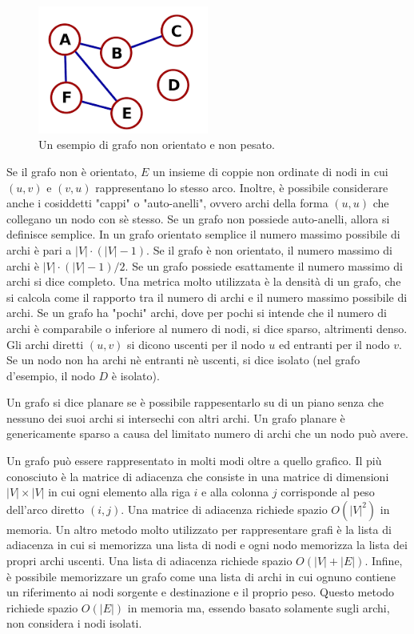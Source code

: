 \documentclass[12pt,a4paper,oneside]{book}
\begin{document}
	\begin{figure}
		\centering
		\includegraphics[width=0.5\textwidth]{grafo-esempio}
		\caption{Un esempio di grafo non orientato e non pesato.}
		\label{fig:grafo-esempio}
	\end{figure}

	Se il grafo non è orientato, $E$ un insieme di coppie non ordinate di nodi in cui $(u,v)$ e $(v,u)$ rappresentano lo stesso arco.	Inoltre, è possibile considerare anche i cosiddetti "cappi" o "auto-anelli", ovvero archi della forma $(u,u)$ che collegano un nodo con sè stesso. Se un grafo non possiede auto-anelli, allora si definisce semplice. In un grafo orientato semplice il numero massimo possibile di archi è pari a $|V|\cdot(|V|-1)$. Se il grafo è non orientato, il numero massimo di archi è $|V|\cdot(|V|-1)/2$. Se un grafo possiede esattamente il numero massimo di archi si dice completo. Una metrica molto utilizzata è la densità di un grafo, che si calcola come il rapporto tra il numero di archi e il numero massimo possibile di archi. Se un grafo ha "pochi" archi, dove per pochi si intende che il numero di archi è comparabile o inferiore al numero di nodi, si dice sparso, altrimenti denso. Gli archi diretti $(u,v)$ si dicono uscenti per il nodo $u$ ed entranti per il nodo $v$. Se un nodo non ha archi nè entranti nè uscenti, si dice isolato (nel grafo d'esempio, il nodo $D$ è isolato).
	
	Un grafo si dice planare se è possibile rappesentarlo su di un piano senza che nessuno dei suoi archi si intersechi con altri archi. Un grafo planare è genericamente sparso a causa del limitato numero di archi che un nodo può avere.
	
	Un grafo può essere rappresentato in molti modi oltre a quello grafico. Il più conosciuto è la matrice di adiacenza che consiste in una matrice di dimensioni $|V|\times |V|$ in cui ogni elemento alla riga $i$ e alla colonna $j$ corrisponde al peso dell'arco diretto $(i,j)$. Una matrice di adiacenza richiede spazio $O(|V|^2)$ in memoria. Un altro metodo molto utilizzato per rappresentare grafi è la lista di adiacenza in cui si memorizza una lista di nodi e ogni nodo memorizza la lista dei propri archi uscenti. Una lista di adiacenza richiede spazio $O(|V|+|E|)$. Infine, è possibile memorizzare un grafo come una lista di archi in cui ognuno contiene un riferimento ai nodi sorgente e destinazione e il proprio peso. Questo metodo richiede spazio $O(|E|)$ in memoria ma, essendo basato solamente sugli archi, non considera i nodi isolati.
	
\end{document}
